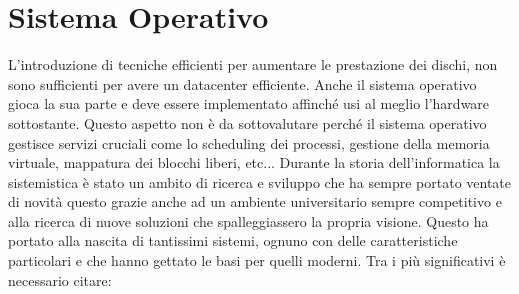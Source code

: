 \section{Sistema Operativo}
L'introduzione di tecniche efficienti per aumentare le prestazione dei dischi, non sono sufficienti per avere un datacenter efficiente. Anche il sistema operativo gioca la sua parte e deve essere implementato affinché usi al meglio l'hardware sottostante. Questo aspetto non è da sottovalutare perché il sistema operativo gestisce servizi cruciali come lo scheduling dei processi, gestione della memoria virtuale, mappatura dei blocchi liberi, etc... Durante la storia dell'informatica la sistemistica è stato un ambito di ricerca e sviluppo che ha sempre portato ventate di novità questo grazie anche ad un ambiente universitario sempre competitivo e alla ricerca di nuove soluzioni che spalleggiassero la propria visione. Questo ha portato alla nascita di tantissimi sistemi, ognuno con delle caratteristiche particolari e che hanno gettato le basi per quelli moderni. Tra i più significativi è necessario citare:
